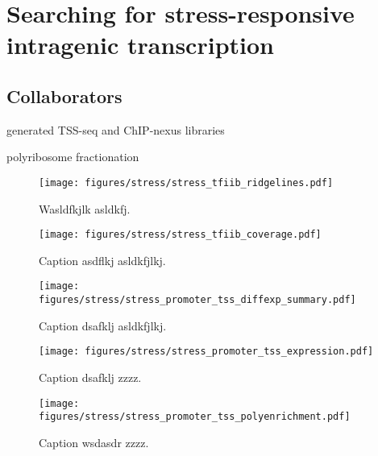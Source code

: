 \chapter{Searching for stress-responsive intragenic transcription}

\section{Collaborators}

\begin{description}[align=right, labelwidth=5cm, noitemsep]
    \item [Steve Doris] generated TSS-seq and ChIP-nexus libraries
    \item [Dan Spatt] polyribosome fractionation
\end{description}

\begin{figure}
\texttt{[image: figures/stress/stress\_tfiib\_ridgelines.pdf]}
\caption[TFIIB ChIP-nexus protection over all genes with stress-induced intragenic TFIIB peaks.]{Wasldfkjlk asldkfj.}
\label{fig:stress_tfiib_ridgelines}
\end{figure}

\begin{figure}
\texttt{[image: figures/stress/stress\_tfiib\_coverage.pdf]}
\label{fig:stress_tfiib_coverage}
\caption[TFIIB ChIP-nexus protection over four genes with stress-induced intragenic TFIIB peaks.]{Caption asdflkj asldkfjlkj.}
\end{figure}

\begin{figure}
\texttt{[image: figures/stress/stress\_promoter\_tss\_diffexp\_summary.pdf]}
\caption[Bar plot of the number of promoters from various genomic classes differentially expressed in oxidative stress.]{Caption dsafklj asldkfjlkj.}
\label{fig:stress_promoter_tss_diffexp_summary}
\end{figure}

\begin{figure}
\texttt{[image: figures/stress/stress\_promoter\_tss\_expression.pdf]}
\caption[TSS-seq expression levels in oxidative stress of oxidative-stress-induced genic and intragenic promoters.]{Caption dsafklj zzzz.}
\label{fig:stress_promoter_tss_diffexp_summary}
\end{figure}

\begin{figure}
\texttt{[image: figures/stress/stress\_promoter\_tss\_polyenrichment.pdf]}
\caption[Polysome enrichment in oxidative stress, for oxidative-stress-induced genic and intragenic promoters.]{Caption wsdasdr zzzz.}
\label{fig:stress_promoter_tss_polyenrichment}
\end{figure}

\newpage

\begingroup
\singlespacing

\endgroup
